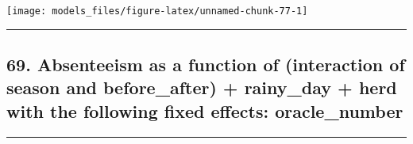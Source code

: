 \documentclass[]{article}
\begin{document}
\begin{center}\texttt{[image: models\_files/figure-latex/unnamed-chunk-77-1]} \end{center}

\newpage

\begin{center}\rule{0.5\linewidth}{\linethickness}\end{center}

\subsection{69. Absenteeism as a function of (interaction of season and
before\_after) + rainy\_day + herd with the following fixed effects:
oracle\_number}\label{absenteeism-as-a-function-of-interaction-of-season-and-before_after-rainy_day-herd-with-the-following-fixed-effects-oracle_number-1}

\begin{center}\rule{0.5\linewidth}{\linethickness}\end{center}
\end{document}

